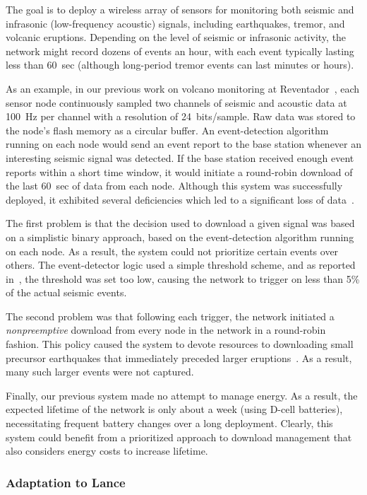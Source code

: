 \documentclass[lettersize]{sig-alternate-konrad}
\begin{document}
The goal is to deploy a wireless array of sensors for 
monitoring both seismic and infrasonic (low-frequency acoustic)
signals, including earthquakes, tremor, and volcanic eruptions. 
Depending on the level of seismic or infrasonic activity, the network 
might record dozens of events an hour, with each event typically lasting 
less than 60~sec (although long-period tremor events can last minutes 
or hours). 

As an example, in our previous work on volcano monitoring at
Reventador~\cite{volcano-osdi06}, each sensor node continuously sampled two
channels of seismic and acoustic data at 100~Hz per channel with a resolution
of 24~bits/sample. Raw data was stored to the node's flash memory as a
circular buffer.  An event-detection algorithm running on each node would
send an event report to the base station whenever an interesting seismic
signal was detected. If the base station received enough event reports within
a short time window, it would initiate a round-robin download of the last
60~sec of data from each node.  Although this system was successfully
deployed, it exhibited several deficiencies which led to a significant loss
of data~\cite{volcano-osdi06}. 

The first problem is that the decision used to download a given signal 
was based on a simplistic binary approach, based on the event-detection 
algorithm running on each node. As a result, the system could not 
prioritize certain events over others. The event-detector logic used 
a simple threshold scheme, and as reported in~\cite{volcano-osdi06}, 
the threshold was set too low, causing the network to trigger on less 
than 5\% of the actual seismic events.

The second problem was that following each trigger, the network 
initiated a {\em nonpreemptive} download from every node in the
network in a round-robin fashion. This policy caused 
the system to devote resources to downloading small precursor earthquakes 
that immediately preceded larger eruptions~\cite{volcano-osdi06}. 
As a result, many such larger events were not captured. 

Finally, our previous system made no attempt to manage energy. 
As a result, the expected lifetime of the
network is only about a week (using D-cell batteries), necessitating
frequent battery changes over a long deployment.
Clearly, this system could benefit from a prioritized approach to
download management that also considers energy costs to increase
lifetime.

\subsubsection{Adaptation to Lance}
\end{document}
